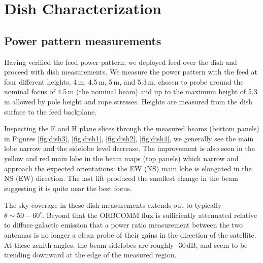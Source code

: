 \documentclass{emulateapj}
\begin{document}

\section{Dish Characterization}

\subsection{Power pattern measurements}

Having verified the feed power pattern, we deployed feed over the dish and proceed with dish measurements. We measure the power pattern with the feed at four different heights, 4\,m, 4.5\,m, 5\,m, and 5.3\,m, chosen to probe around the nominal focus of 4.5\,m (the nominal beam) and up to the maximum height of 5.3\,m allowed by pole height and rope stresses. Heights are measured from the dish surface to the feed backplane. 

Inspecting the E and H plane slices through the measured beams (bottom panels) in Figures \ref{fig:dish3}, \ref{fig:dish1}, \ref{fig:dish2}, \ref{fig:dish4}, we generally see the main lobe narrow and the sidelobe level decrease. The improvement is also seen in the yellow and red main lobe in the beam maps (top panels) which narrow and approach the expected orientations: the EW (NS) main lobe is elongated in the NS (EW) direction. The last lift produced the smallest change in the beam suggesting it is quite near the best focus. 

The sky coverage in these dish measurements extends out to typically $\theta\sim50-60^\circ$. Beyond that the ORBCOMM flux is sufficiently attenuated relative to diffuse galactic emission that a power ratio measurement between the two antennas is no longer a clean probe of their gains in the direction of the satellite. At these zenith angles, the beam sidelobes are roughly -30\,dB, and seem to be trending downward at the edge of the measured region.

\end{document}
